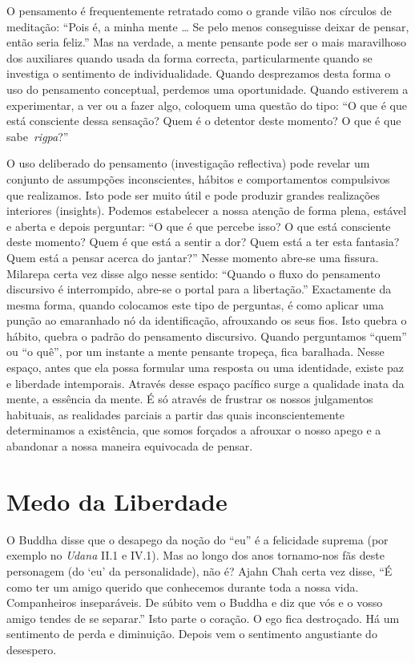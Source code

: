 O pensamento é frequentemente retratado como o grande vilão nos círculos
de meditação: ``Pois é, a minha mente \ldots{} Se pelo menos conseguisse
deixar de pensar, então seria feliz.'' Mas na verdade, a mente pensante
pode ser o mais maravilhoso dos auxiliares quando usada da forma
correcta, particularmente quando se investiga o sentimento de
individualidade. Quando desprezamos desta forma o uso do pensamento
conceptual, perdemos uma oportunidade. Quando estiverem a experimentar,
a ver ou a fazer algo, coloquem uma questão do tipo: ``O que é que está
consciente dessa sensação? Quem é o detentor deste momento? O que é que
sabe~\emph{rigpa}?''

O uso deliberado do pensamento (investigação reflectiva) pode revelar um
conjunto de assumpções inconscientes, hábitos e comportamentos
compulsivos que realizamos. Isto pode ser muito útil e pode produzir
grandes realizações interiores (insights). Podemos estabelecer a nossa
atenção de forma plena, estável e aberta e depois perguntar: ``O que é
que percebe isso? O que está consciente deste momento? Quem é que está a
sentir a dor? Quem está a ter esta fantasia? Quem está a pensar acerca
do jantar?'' Nesse momento abre-se uma fissura. Milarepa certa vez disse
algo nesse sentido: ``Quando o fluxo do pensamento discursivo é
interrompido, abre-se o portal para a libertação.'' Exactamente da mesma
forma, quando colocamos este tipo de perguntas, é como aplicar uma
punção ao emaranhado nó da identificação, afrouxando os seus fios. Isto
quebra o hábito, quebra o padrão do pensamento discursivo. Quando
perguntamos ``quem'' ou ``o quê'', por um instante a mente pensante
tropeça, fica baralhada. Nesse espaço, antes que ela possa formular uma
resposta ou uma identidade, existe paz e liberdade intemporais. Através
desse espaço pacífico surge a qualidade inata da mente, a essência da
mente. É só através de frustrar os nossos julgamentos habituais, as
realidades parciais a partir das quais inconscientemente determinamos a
existência, que somos forçados a afrouxar o nosso apego e a abandonar a
nossa maneira equivocada de pensar.

\section{Medo da Liberdade}

O Buddha disse que o desapego da noção do ``eu'' é a felicidade suprema
(por exemplo no \emph{Udana} II.1 e IV.1). Mas ao longo dos anos
tornamo-nos fãs deste personagem (do `eu' da personalidade), não é?
Ajahn Chah certa vez disse, ``É como ter um amigo querido que conhecemos
durante toda a nossa vida. Companheiros inseparáveis. De súbito vem o
Buddha e diz que vós e o vosso amigo tendes de se separar.'' Isto parte
o coração. O ego fica destroçado. Há um sentimento de perda e
diminuição. Depois vem o sentimento angustiante do desespero.

